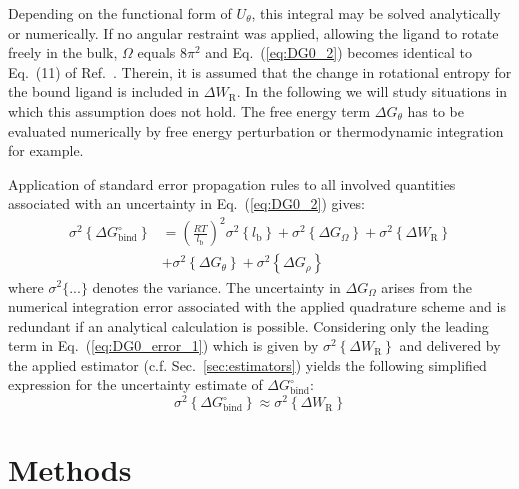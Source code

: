 \documentclass[9pt,lessons]{livecoms}
\begin{document}
Depending on the functional form of $U_\theta$, this integral may be solved analytically or numerically.
If no angular restraint was applied, allowing the ligand to rotate freely in the bulk, $\Omega$ equals $8 \pi^2$ and Eq.~(\ref{eq:DG0_2}) becomes identical to Eq.~(11) of Ref.~. 
Therein, it is assumed that the change in rotational entropy for the bound ligand is included in $\Delta W_\mathrm{R}$.
In the following we will study situations in which this assumption does not hold.
The free energy term $\Delta G_\theta$ has to be evaluated numerically by free energy perturbation or thermodynamic integration for example.

Application of standard error propagation rules to all involved quantities associated with an uncertainty in Eq.~(\ref{eq:DG0_2}) gives:
\begin{equation}
\begin{split}
\sigma^2 \left\{\Delta G^\circ_\mathrm{bind} \right\}  & = \left(  \frac{RT}{l_\mathrm{b} } \right)^2 \sigma^2 \left \{ l_\mathrm{b} \right \} + \sigma^2 \left\{ \Delta G_\Omega \right\} + \sigma^2 \left \{ \Delta W_\mathrm{R} \right \} \\\
& + \sigma^2 \left\{ \Delta G_\theta \right\} + \sigma^2 \left\{ \Delta G_\rho \right\} 
\end{split}
\label{eq:DG0_error_1}
\end{equation}
where $\sigma^2 \{...\}$ denotes the variance. 
The uncertainty in $\Delta G_\Omega$ arises from the numerical integration error associated with the applied quadrature scheme and is redundant if an analytical calculation is possible. 
Considering only the leading term in Eq.~(\ref{eq:DG0_error_1}) which is given by $\sigma^2 \left \{ \Delta W_\mathrm{R} \right \}$ and delivered by the applied estimator (c.f. Sec.~\ref{sec:estimators})  
yields the following simplified expression for the uncertainty estimate of $\Delta G^\circ_\mathrm{bind}$:
\begin{equation}
\sigma^2 \left\{\Delta G^\circ_\mathrm{bind} \right\}  \approx \sigma^2 \left \{ \Delta W_\mathrm{R} \right \}
\label{eq:DG0_error_2}
\end{equation}

\section{Methods}
\end{document}

